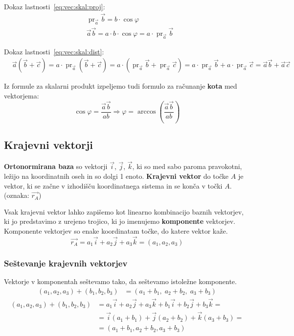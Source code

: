 \documentclass[a4paper,oneside,12pt,fleqn]{article}
\newcommand\krat\cdot
\newcommand{\pr}{\ensuremath{\operatorname{pr}}} %
\def\kos{\cos}
\def\Vec{\overrightarrow}
\renewcommand\implies\Rightarrow
\numberwithin{equation}{section}
\begin{document}
Dokaz lastnosti~\ref{eq:vec:skal:proj}:
\begin{align*}
  &\pr_{\vec{a}}\vec{b} = b\krat\kos\varphi \\
  &\vec{a}\vec{b} = a\krat b\krat\kos\varphi = a \krat\pr_{\vec{a}}\vec{b}
\end{align*}

Dokaz lastnosti~\ref{eq:vec:skal:dist}:
\begin{align*}
  &\vec{a}(\vec{b} + \vec{c}) = a\krat\pr_{\vec{a}}(\vec{b}+\vec{c}) =
  a\krat(\pr_{\vec{a}}\vec{b} + \pr_{\vec{a}}\vec{c}) =
  a\krat\pr_{\vec{a}}\vec{b} + a\krat\pr_{\vec{a}}\vec{c} = \vec{a}\vec{b} +
  \vec{a}\vec{c}
\end{align*}

Iz formule za skalarni produkt izpeljemo tudi formulo za računanje \textbf{kota} med vektorjema:
\[ \kos\varphi = \frac{\vec{a}\vec{b}}{ab} \implies \varphi = \arccos\left(
\frac{\vec{a}\vec{b}}{ab} \right) \]

\subsection{Krajevni vektorji}
\label{sec:vec:kraj}
\textbf{Ortonormirana baza} so vektorji $\vec{i}$, $\vec{j}$, $\vec{k}$,
ki so med sabo paroma pravokotni, ležijo na koordinatnih oseh in so dolgi 1 enoto.
\textbf{Krajevni vektor} do točke $A$ je vektor, ki se začne v izhodišču koordinatnega sistema in se
konča v točki $A$. (oznaka: $\Vec{r_A}$)

Vsak krajevni vektor lahko zapišemo kot linearno kombinacijo baznih vektorjev, ki jo
predstavimo z urejeno trojico, ki jo imenujemo \textbf{komponente} vektorjev.
Komponente vektorjev so enake koordinatam točke, do katere vektor kaže.
\[ \Vec{r_A} = a_1\vec{i} + a_2\vec{j} + a_3\vec{k} = (a_1,a_2,a_3) \]

\subsubsection{Seštevanje krajevnih vektorjev}
\label{sec:vec:kraj:sest}
Vektorje v komponentah seštevamo tako, da seštevamo istoležne komponente.
\boldmath
\begin{align*}
  (a_1,a_2,a_3) + (b_1,b_2,b_3) &=  (a_1+b_1,\;a_2+b_2,\;a_3+b_3)
\end{align*}
\unboldmath
\begin{align*}
  (a_1,a_2,a_3) + (b_1,b_2,b_3) &=  a_1\vec{i} + a_2\vec{j} + a_3\vec{k} + b_1\vec{i} +
  b_2\vec{j} + b_3\vec{k}=\\ &=
  \vec{i}(a_1 + b_1) + \vec{j}(a_2+b_2) + \vec{k}(a_3+b_3) =\\&=  (a_1+b_1,a_2+b_2,a_3+b_3)
\end{align*}
\end{document}
